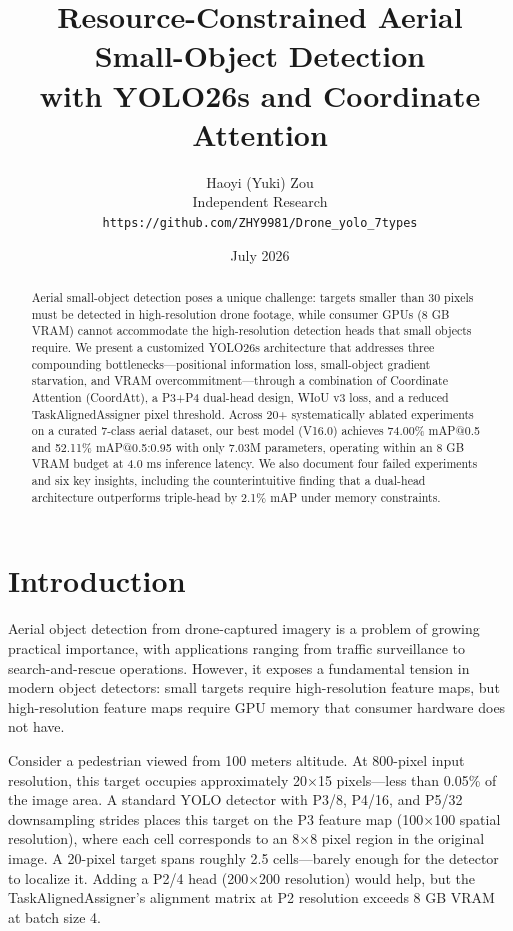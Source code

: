 \documentclass[11pt]{article}
\title{\textbf{Resource-Constrained Aerial Small-Object Detection\\with YOLO26s and Coordinate Attention}}
\author{
    Haoyi (Yuki) Zou\\[2mm]
    \small Independent Research\\[1mm]
    \small \texttt{https://github.com/ZHY9981/Drone\_yolo\_7types}
}
\date{July 2026}
\begin{document}
\maketitle

\begin{abstract}
Aerial small-object detection poses a unique challenge: targets smaller than 30 pixels must be
detected in high-resolution drone footage, while consumer GPUs (8 GB VRAM) cannot accommodate
the high-resolution detection heads that small objects require. We present a customized YOLO26s
architecture that addresses three compounding bottlenecks—positional information loss, small-object
gradient starvation, and VRAM overcommitment—through a combination of Coordinate Attention (CoordAtt),
a P3+P4 dual-head design, WIoU v3 loss, and a reduced TaskAlignedAssigner pixel threshold. Across
20+ systematically ablated experiments on a curated 7-class aerial dataset, our best model (V16.0)
achieves 74.00\% mAP@0.5 and 52.11\% mAP@0.5:0.95 with only 7.03M parameters, operating within
an 8 GB VRAM budget at 4.0 ms inference latency. We also document four failed experiments and six
key insights, including the counterintuitive finding that a dual-head architecture outperforms
triple-head by 2.1\% mAP under memory constraints.
\end{abstract}

\section{Introduction}

Aerial object detection from drone-captured imagery is a problem of growing practical importance,
with applications ranging from traffic surveillance to search-and-rescue operations. However, it
exposes a fundamental tension in modern object detectors: small targets require high-resolution
feature maps, but high-resolution feature maps require GPU memory that consumer hardware does
not have.

Consider a pedestrian viewed from 100 meters altitude. At 800-pixel input resolution, this target
occupies approximately 20$\times$15 pixels—less than 0.05\% of the image area. A standard YOLO
detector with P3/8, P4/16, and P5/32 downsampling strides places this target on the P3 feature map
(100$\times$100 spatial resolution), where each cell corresponds to an 8$\times$8 pixel region in
the original image. A 20-pixel target spans roughly 2.5 cells—barely enough for the detector to
localize it. Adding a P2/4 head (200$\times$200 resolution) would help, but the TaskAlignedAssigner's
alignment matrix at P2 resolution exceeds 8 GB VRAM at batch size 4.
\end{document}
